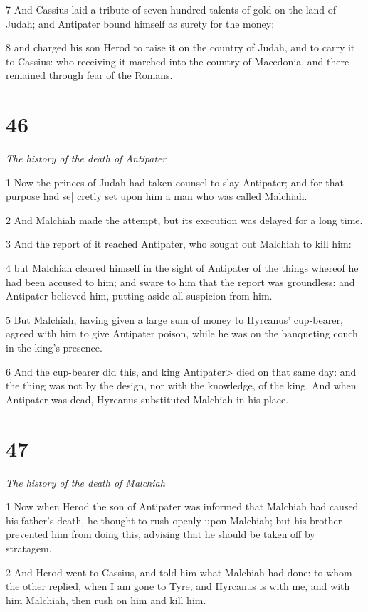 7 And Cassius laid a tribute of seven hundred talents of gold on the land of Judah; and Antipater bound himself as surety for the money; 

8 and charged his son Herod to raise it on the country of Judah, and to carry it to Cassius: who receiving it marched into the country of Macedonia, and there remained through fear of the Romans. 

\chapter{46}

\par \textit{The history of the death of Antipater}

1 Now the princes of Judah had taken counsel to slay Antipater; and for that purpose had se| cretly set upon him a man who was called Malchiah. 

2 And Malchiah made the attempt, but its execution was delayed for a long time. 

3 And the report of it reached Antipater, who sought out Malchiah to kill him: 

4 but Malchiah cleared himself in the sight of Antipater of the things whereof he had been accused to him; and sware to him that the report was groundless: and Antipater believed him, putting aside all suspicion from him. 

5 But Malchiah, having given a large sum of money to Hyrcanus’ cup-bearer, agreed with him to give Antipater poison, while he was on the banqueting couch in the king’s presence. 

6 And the cup-bearer did this, and king Antipater> died on that same day: and the thing was not by the design, nor with the knowledge, of the king. And when Antipater was dead, Hyrcanus substituted Malchiah in his place. 

\chapter{47}

\par \textit{The history of the death of Malchiah}

1 Now when Herod the son of Antipater was informed that Malchiah had caused his father’s death, he thought to rush openly upon Malchiah; but his brother prevented him from doing this, advising that he should be taken off by stratagem. 

2 And Herod went to Cassius, and told him what Malchiah had done: to whom the other replied, when I am gone to Tyre, and Hyrcanus is with me, and with him Malchiah, then rush on him and kill him. 

